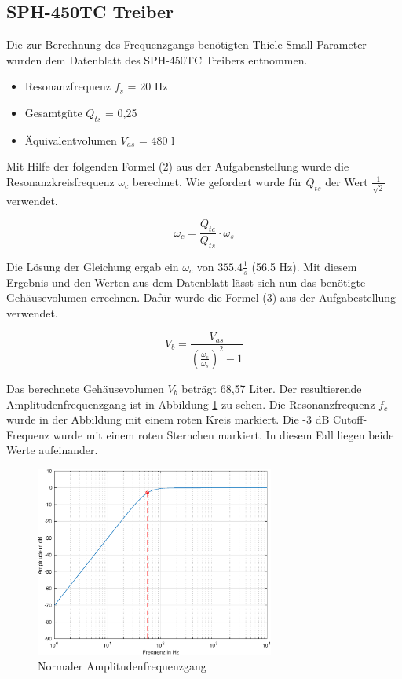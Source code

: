 \subsection{SPH-450TC Treiber}
\label{subsec:c}

Die zur Berechnung des Frequenzgangs benötigten Thiele-Small-Parameter wurden dem Datenblatt \cite{SPH-450TC} des SPH-450TC Treibers entnommen.

\begin{itemize}
  \item Resonanzfrequenz $f_s$ = 20 Hz
  \item Gesamtgüte $Q_{ts}$ = 0,25
  \item Äquivalentvolumen $V_{as}$ = 480 l
\end{itemize}

Mit Hilfe der folgenden Formel (2) aus der Aufgabenstellung wurde die Resonanzkreisfrequenz $\omega_c$ berechnet.
Wie gefordert wurde für $Q_{ts}$ der Wert $\frac{1}{\sqrt{2}}$ verwendet.

\[
\omega_c = \frac{Q_{tc}}{Q_{ts}} \cdot \omega_s 
\]

Die Lösung der Gleichung ergab ein $\omega_c$ von $355.4 \frac{1}{s}$ (56.5 Hz). 
Mit diesem Ergebnis und den Werten aus dem Datenblatt lässt sich nun das benötigte Gehäusevolumen errechnen.
Dafür wurde die Formel (3) aus der Aufgabestellung verwendet.

\[
V_b = \frac{V_{as}} {\left( \frac{\omega_c}{\omega_s} \right) ^{2} - 1}
\]

Das berechnete Gehäusevolumen  $V_b$ beträgt 68,57 Liter.
Der resultierende Amplitudenfrequenzgang ist in Abbildung \ref{fig:Normaler_Frequenzgang} zu sehen.
Die Resonanzfrequenz $f_c$ wurde in der Abbildung mit einem roten Kreis markiert. 
Die -3 dB Cutoff-Frequenz wurde mit einem roten Sternchen markiert.
In diesem Fall liegen beide Werte aufeinander.

\begin{figure}[H]
    \centering
    \includegraphics[width=0.7\textwidth]{Figures/Normaler_Frequenzgang.eps}
    \caption{Normaler Amplitudenfrequenzgang}
    \label{fig:Normaler_Frequenzgang}
\end{figure}%


